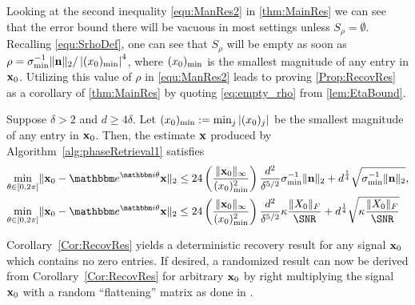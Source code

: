 Looking at the second inequality \eqref{equ:ManRes2} in \cref{thm:MainRes} we can see that the error bound there will be vacuous in most settings unless $S_\rho = \emptyset$.  Recalling \eqref{equ:SrhoDef}, one can see that $S_\rho$ will be empty as soon as $\rho = \sigma_{\min}^{-1} \| \mathbf n \|_2 / \left| (x_0)_{\rm min} \right|^4$, where $(x_0)_{\rm min}$ is the smallest magnitude of any entry in $\mathbf x_0$.  Utilizing this value of $\rho$ in \eqref{equ:ManRes2} leads to proving \cref{Prop:RecovRes} as a corollary of \cref{thm:MainRes} by quoting \eqref{eq:empty_rho} from \cref{lem:EtaBound}.

\begin{corollary}
Suppose $\delta > 2$ and $d \ge 4 \delta$.  Let $(x_0)_{\rm min} := \min_j |(x_0)_j|$ be the smallest magnitude of any entry in $\mathbf x_0$.  Then, the estimate $\mathbf x$ produced by Algorithm~\ref{alg:phaseRetrieval1} satisfies 
\[\begin{aligned}
\mintheta \norm{\x_0 - \eit \x}_2 &\leq 24 \left( \frac{\norm{\x_0}_{\infty}}{(x_0)^2_{\rm min}} \right) \frac{d^2}{\delta^{5/2}} \sigma_{\min}^{-1} \norm{\n}_2 + d^{\frac{1}{4}} \sqrt{\sigma_{\min}^{-1} \norm{\n}_2 }, \\
\mintheta \norm{\x_0 - \eit \x}_2 &\leq 24 \left( \frac{\norm{\x_0}_{\infty}}{(x_0)^2_{\rm min}} \right) \frac{d^2}{\delta^{5/2}} \kappa \frac{\norm{X_0}_F}{\SNR} + d^{\frac{1}{4}} \sqrt{\kappa \frac{\norm{X_0}_F}{\SNR} }
\end{aligned}
\]
\label{Cor:RecovRes}
\end{corollary}

Corollary~\ref{Cor:RecovRes} yields a deterministic recovery result for any signal $\mathbf x_0$ which contains no zero entries.  If desired, a randomized result can now be derived from Corollary~\ref{Cor:RecovRes} for arbitrary $\mathbf x_0$ by right multiplying the signal $\mathbf x_0$ %
with a random ``flattening'' matrix as done in \cite{IVW2015_FastPhase}. %
